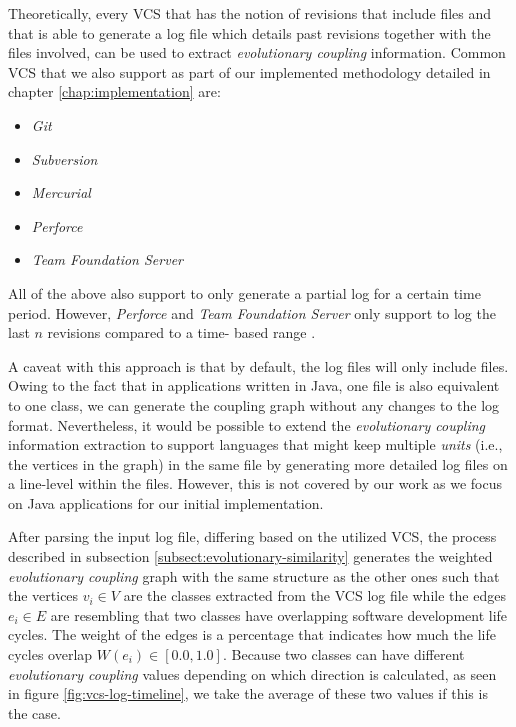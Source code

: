 \documentclass[12pt,a4paper]{report}
\begin{document}
Theoretically, every VCS that has the notion of revisions that include files
and that is able to generate a log file which details past revisions together
with the files involved, can be used to extract \textit{evolutionary coupling}
information. Common VCS that we also support as part of our implemented
methodology detailed in chapter \ref{chap:implementation} are:
\begin{itemize}[noitemsep]
  \item \textit{Git}
  \item \textit{Subversion}
  \item \textit{Mercurial}
  \item \textit{Perforce}
  \item \textit{Team Foundation Server}
\end{itemize}
All of the above also support to only generate a partial log for a
certain time period. However, \textit{Perforce} and \textit{Team Foundation
Server} only support to log the last \(n\) revisions compared to a time\hyp
based range \cite{perforce, team-foundation-server}.

A caveat with this approach is that by default, the log files will only include
files. Owing to the fact that in applications written in Java, one file is also
equivalent to one class, we can generate the coupling graph without any changes
to the log format. Nevertheless, it would be possible to extend the \textit{
evolutionary coupling} information extraction to support languages that might
keep multiple \textit{units} (i.e., the vertices in the graph) in the same file
by generating more detailed log files on a line-level within the files.
However, this is not covered by our work as we focus on Java applications for
our initial implementation.

After parsing the input log file, differing based on the utilized VCS, the
process described in subsection \ref{subsect:evolutionary-similarity} generates
the weighted \textit{evolutionary coupling} graph with the same structure as
the other ones such that the vertices \(v_i \in V\) are the classes extracted
from the VCS log file while the edges \(e_i \in E\) are resembling that two
classes have overlapping software development life cycles. The weight of the
edges is a percentage that indicates how much the life cycles overlap
\(W(e_i) \in [0.0, 1.0]\). Because two classes can have different
\textit{evolutionary coupling} values depending on which direction is calculated,
as seen in figure \ref{fig:vcs-log-timeline}, we take the average of these
two values if this is the case.
\end{document}
